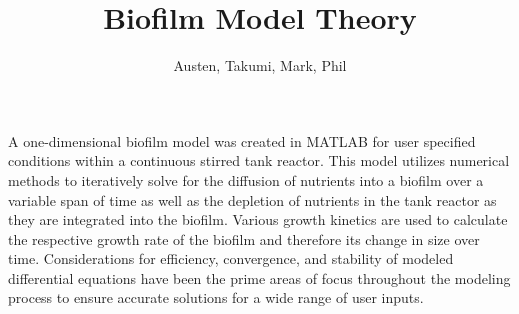 \documentclass[letterpaper, twoside]{article}
\title{Biofilm Model Theory}
\author{Austen, Takumi, Mark, Phil}
\date{}
\numberwithin{equation}{section}
\begin{document}
\maketitle

\abstract
A one-dimensional biofilm model was created in MATLAB for user specified conditions within a continuous stirred tank reactor. This model utilizes numerical methods to iteratively solve for the diffusion of nutrients into a biofilm over a variable span of time as well as the depletion of nutrients in the tank reactor as they are integrated into the biofilm. Various growth kinetics are used to calculate the respective growth rate of the biofilm and therefore its change in size over time. Considerations for efficiency, convergence, and stability of modeled differential equations have been the prime areas of focus throughout the modeling process to ensure accurate solutions for a wide range of user inputs.
\end{document}
